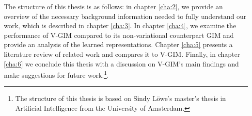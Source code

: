 The structure of this thesis is as follows: in chapter \ref{cha:2}, we provide an overview of the necessary background information needed to fully understand our work, which is described in chapter \ref{cha:3}. In chapter \ref{cha:4}, we examine the performance of V-GIM compared to its non-variational counterpart GIM and provide an analysis of the learned representations. Chapter \ref{cha:5} presents a literature review of related work and compares it to V-GIM. Finally, in chapter \ref{cha:6} we conclude this thesis with a discussion on V-GIM's main findings and make suggestions for future work.\footnote{The structure of this thesis is based on Sindy Löwe's master's thesis in Artificial Intelligence from the University of Amsterdam.}. 




%
%



%



